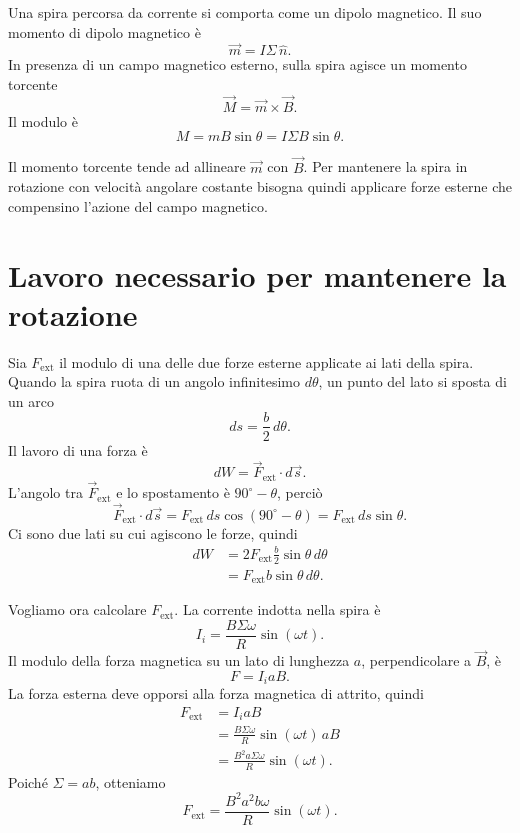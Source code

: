 \documentclass[a4paper]{article}
\begin{document}
Una spira percorsa da corrente si comporta come un dipolo magnetico. Il suo momento di dipolo magnetico è
\[
\vec{m}=I\Sigma\,\hat{n}.
\]
In presenza di un campo magnetico esterno, sulla spira agisce un momento torcente
\[
\vec{M}=\vec{m}\times\vec{B}.
\]
Il modulo è
\[
M=mB\sin\theta=I\Sigma B\sin\theta.
\]

Il momento torcente tende ad allineare \(\vec{m}\) con \(\vec{B}\). Per mantenere la spira in rotazione con velocità angolare costante bisogna quindi applicare forze esterne che compensino l'azione del campo magnetico.

\begin{center}
\end{center}

\section{Lavoro necessario per mantenere la rotazione}

Sia \(F_{\mathrm{ext}}\) il modulo di una delle due forze esterne applicate ai lati della spira. Quando la spira ruota di un angolo infinitesimo \(d\theta\), un punto del lato si sposta di un arco
\[
ds=\frac{b}{2}\,d\theta.
\]
Il lavoro di una forza è
\[
dW=\vec{F}_{\mathrm{ext}}\cdot d\vec{s}.
\]
L'angolo tra \(\vec{F}_{\mathrm{ext}}\) e lo spostamento è \(90^\circ-\theta\), perciò
\[
\vec{F}_{\mathrm{ext}}\cdot d\vec{s}=F_{\mathrm{ext}}\,ds\cos(90^\circ-\theta)
=F_{\mathrm{ext}}\,ds\sin\theta.
\]
Ci sono due lati su cui agiscono le forze, quindi
\begin{align*}
dW
&=2F_{\mathrm{ext}}\frac{b}{2}\sin\theta\,d\theta \\
&=F_{\mathrm{ext}}b\sin\theta\,d\theta.
\end{align*}

Vogliamo ora calcolare \(F_{\mathrm{ext}}\). La corrente indotta nella spira è
\[
I_i=\frac{B\Sigma\omega}{R}\sin(\omega t).
\]
Il modulo della forza magnetica su un lato di lunghezza \(a\), perpendicolare a \(\vec{B}\), è
\[
F=I_i aB.
\]
La forza esterna deve opporsi alla forza magnetica di attrito, quindi
\begin{align*}
F_{\mathrm{ext}}
&=I_i aB \\
&=\frac{B\Sigma\omega}{R}\sin(\omega t)\,aB \\
&=\frac{B^2a\Sigma\omega}{R}\sin(\omega t).
\end{align*}
Poiché \(\Sigma=ab\), otteniamo
\[
F_{\mathrm{ext}}=\frac{B^2a^2b\omega}{R}\sin(\omega t).
\]
\end{document}

